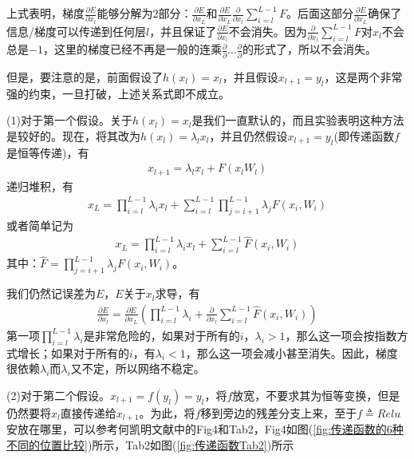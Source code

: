             上式表明，梯度$\frac{\partial E}{\partial x_l}$能够分解为2部分：$\frac{\partial E}{\partial x_L}$和$\frac{\partial E}{\partial x_L}\frac{\partial }{\partial x_l}\sum\limits_{i=l}^{L-1}F$。后面这部分$\frac{\partial E}{\partial x_L}$确保了信息/梯度可以传递到任何层$l$，并且保证了$\frac{\partial E}{\partial x_l}$不会消失。因为$\frac{\partial }{\partial x_l}\sum\limits_{i=l}^{L-1}F$对$x_l$不会总是$-1$，这里的梯度已经不再是一般的连乘$\frac{\partial }{\partial}\dots\frac{\partial }{\partial}$的形式了，所以不会消失。
            \par
            但是，要注意的是，前面假设了$h(x_l) = x_l$，并且假设$x_{l+1} =y_l$，这是两个非常强的约束，一旦打破，上述关系式即不成立。
            \par
            (1)对于第一个假设。关于$h(x_l) = x_l$是我们一直默认的，而且实验表明这种方法是较好的。现在，将其改为$h(x_l) = \lambda_l x_l$，并且仍然假设$x_{l+1} = y_l$(即传递函数$f$是恒等传递)，有
            \begin{align*}
            x_{l+1} = \lambda_l x_l + F(x_l W_l)
            \end{align*}
            递归堆积，有
            \begin{align*}
            x_L = \prod_{i=l}^{L-1} \lambda_i x_l + \sum_{i=l}^{L-1}\prod_{j=i+1}^{L-1}\lambda_jF(x_i,W_i)
            \end{align*}
            或者简单记为
            \begin{align*}
            x_L = \prod_{i=l}^{L-1} \lambda_i x_l + \sum_{i=l}^{L-1}\hat{F}(x_i,W_i)
            \end{align*}
            其中：$\hat{F} = \prod\limits_{j=i+1}^{L-1}\lambda_jF(x_i,W_i)$。
            \par
            我们仍然记误差为$E$，$E$关于$x_l$求导，有
            \begin{align*}
            \frac{\partial E}{\partial x_l} = \frac{\partial E}{\partial x_L} \left( \prod_{i=l}^{L-1}\lambda_i + \frac{\partial }{\partial x_l} \sum_{i=l}^{L-1}\hat{F}(x_i,W_i) \right)
            \end{align*}
            第一项$\prod\limits_{i=l}^{L-1}\lambda_i $是非常危险的，如果对于所有的$i$，$\lambda_i >1$，那么这一项会按指数方式增长；如果对于所有的$i$，有$\lambda_i < 1$，那么这一项会减小甚至消失。因此，梯度很依赖$\lambda_i$而$\lambda_i$又不定，所以网络不稳定。
            \par
            (2)对于第二个假设。$x_{l+1} = f(y_l) = y_l$，将$f$放宽，不要求其为恒等变换，但是仍然要将$x_l$直接传递给$x_{l+1}$。为此，将$f$移到旁边的残差分支上来，至于$f\triangleq Relu$安放在哪里，可以参考何凯明文献\cite{2016.Kaiming}中的Fig4和Tab2，Fig4如图(\ref{fig:传递函数的6种不同的位置比较})所示，Tab2如图(\ref{fig:传递函数Tab2})所示
